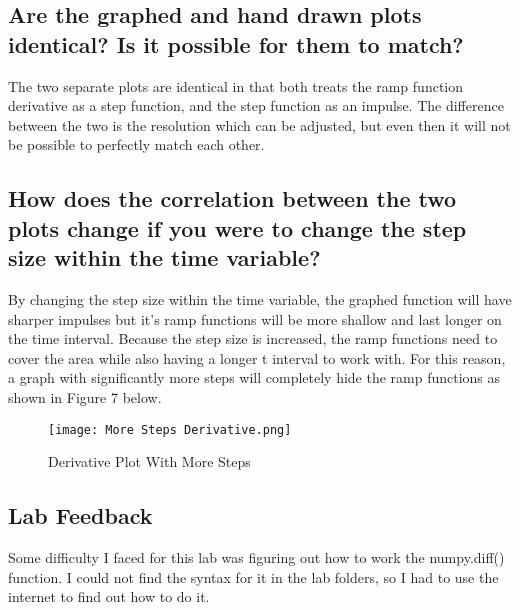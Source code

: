 \documentclass[footheight=20pt, footsepline, headhight=20pt, headsepline]{scrartcl}
\begin{document}
\subsection{Are the graphed and hand drawn plots identical? Is it possible for them to match?}
\hspace{\parindent}The two separate plots are identical in that both treats the ramp function derivative as a step function, and the step function as an impulse. The difference between the two is the resolution which can be adjusted, but even then it will not be possible to perfectly match each other.
\subsection{How does the correlation between the two plots change if you were to change the step size within the time variable?}
\hspace{\parindent}By changing the step size within the time variable, the graphed function will have sharper impulses but it's ramp functions will be more shallow and last longer on the time interval. Because the step size is increased, the ramp functions need to cover the area while also having a longer t interval to work with. For this reason, a graph with significantly more steps will completely hide the ramp functions as shown in Figure 7 below.
\begin{figure}[h!]
    \centering
    \texttt{[image: More Steps Derivative.png]}
    \caption{Derivative Plot With More Steps}
    \label{Figure 6:}
\end{figure}
\subsection{Lab Feedback}
\hspace{\parindent}Some difficulty I faced for this lab was figuring out how to work the numpy.diff() function. I could not find the syntax for it in the lab folders, so I had to use the internet to find out how to do it. 
\end{document}
